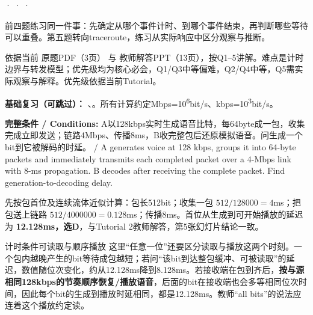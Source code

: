 


 ·  ·  · 


前四题练习同一件事：先确定从哪个事件计时、到哪个事件结束，再判断哪些等待可以重叠。第五题转向traceroute，练习从实际响应中区分观察与推断。

依据当前 原题PDF（3页） 与 教师解答PPT（13页），按Q1–5讲解。难点是计时边界与转发模型；优先级均为核心必会，Q1/Q3中等偏难，Q2/Q4中等，Q5需实际观察与解释。优先级依据当前Tutorial。


\textbf{基础复习（可跳过）：} 、。所有计算约定Mbps=10\textsuperscript{6}bit/s、kbps=10\textsuperscript{3}bit/s。








\textbf{完整条件 / Conditions:} A以128kbps实时生成语音比特，每64byte成一包，收集完成立即发送；链路4Mbps、传播8ms，B收完整包后还原模拟语音。问生成一个bit到它被解码的时延。 / A generates voice at 128 kbps, groups it into 64-byte packets and immediately transmits each completed packet over a 4-Mbps link with 8-ms propagation. B decodes after receiving the complete packet. Find generation-to-decoding delay.




先按包首位及连续流体近似计算：包长512bit；收集一包 \(512/128000=4\)ms；把包送上链路 \(512/4000000=0.128\)ms；传播8ms。首位从生成到可开始播放的延迟为 \textbf{12.128ms，选D}，与Tutorial 2教师解答，第5张幻灯片结论一致。


\begin{StudyBlock}{计时条件}{可读取与顺序播放}
这里“任意一位”还要区分读取与播放这两个时刻。一个包内越晚产生的bit等待成包越短；若问“该bit到达整包缓冲、可被读取”的延迟，数值随位次变化，约从12.128ms降到8.128ms。若接收端在包到齐后，\textbf{按与源相同128kbps的节奏顺序恢复/播放语音}，后面的bit在接收端也会多等相同位次时间，因此每个bit的生成到播放时延相同，都是12.128ms。教师“all bits”的说法应连着这个播放约定读。
\end{StudyBlock}


